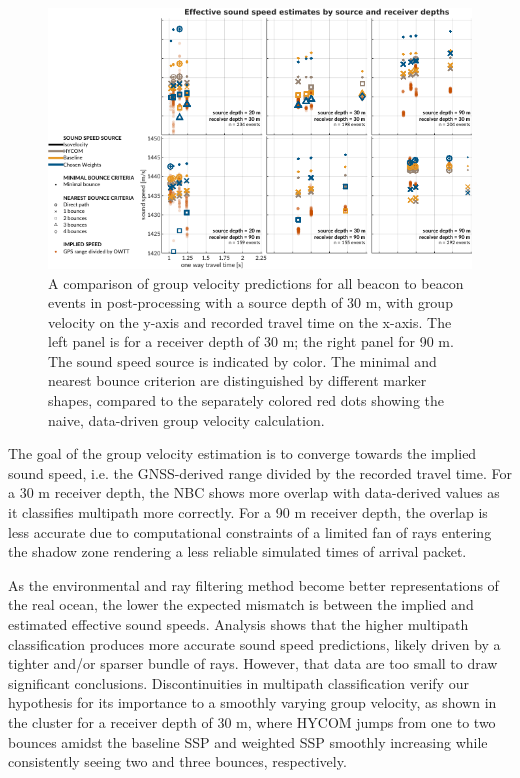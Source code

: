 \begin{figure}[h!]
\includegraphics[width=\columnwidth]{figs/gvel-txrxdepth-wIso-wGPS.pdf}
\caption{A comparison of group velocity predictions for all beacon to beacon events in post-processing with a source depth of 30 m, with group velocity on the y-axis and recorded travel time on the x-axis. The left panel is for a receiver depth of 30 m; the right panel for 90 m. The sound speed source is indicated by color. The minimal and nearest bounce criterion are distinguished by different marker shapes, compared to the separately colored red dots showing the naive, data-driven group velocity calculation.}
\label{fig:gvel-post}
\end{figure}

The goal of the group velocity estimation is to converge towards the implied sound speed, i.e. the GNSS-derived range divided by the recorded travel time.
For a 30 m receiver depth, the NBC shows more overlap with data-derived values as it classifies multipath more correctly.
For a 90 m receiver depth, the overlap is less accurate due to computational constraints of a limited fan of rays entering the shadow zone rendering a less reliable simulated times of arrival packet.

As the environmental and ray filtering method become better representations of the real ocean, the lower the expected mismatch is between the implied and estimated effective sound speeds.
Analysis shows that the higher multipath classification produces more accurate sound speed predictions, likely driven by a tighter and/or sparser bundle of rays.
However, that data are too small to draw significant conclusions.
 Discontinuities in multipath classification verify our hypothesis for its importance to a smoothly varying group velocity, as shown in the cluster for a receiver depth of 30 m, where HYCOM jumps from one to two bounces amidst the baseline SSP and weighted SSP smoothly increasing while consistently seeing two and three bounces, respectively.

